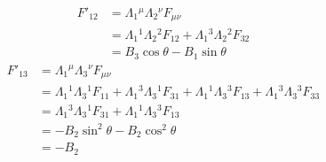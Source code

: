 \begin{align}
    F'_{12} &= \Lambda_1{^\mu}\Lambda_2{^\nu}F_{\mu\nu} \\
    &= \Lambda_1{^1}\Lambda_2{^2}F_{12} + \Lambda_1{^3}\Lambda_2{^2}F_{32} \\
    &= B_3 \cos{\theta} - B_1 \sin{\theta} 
\end{align}
\begin{align}
    F'_{13} &= \Lambda_1{^\mu}\Lambda_3{^\nu}F_{\mu\nu} \\
    &= \Lambda_1{^1}\Lambda_3{^1}F_{11} + \Lambda_1{^3}\Lambda_3{^1}F_{31} + \Lambda_1{^1}\Lambda_3{^3}F_{13} + \Lambda_1{^3}\Lambda_3{^3}F_{33}\\
    &= \Lambda_1{^3}\Lambda_3{^1}F_{31} + \Lambda_1{^1}\Lambda_3{^3}F_{13} \\
    &= -B_2 \sin^2{\theta} - B_2 \cos^2{\theta} \\
    &= -B_2
\end{align}
